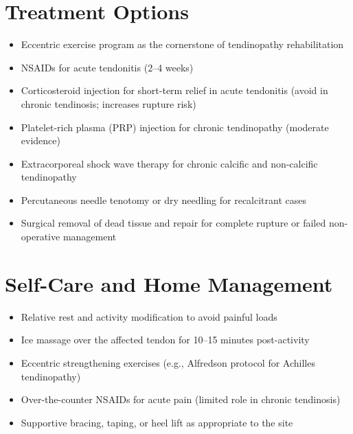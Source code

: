 \section*{Treatment Options}
\begin{itemize}
  \item Eccentric exercise program as the cornerstone of tendinopathy rehabilitation
  \item NSAIDs for acute tendonitis (2--4 weeks)
  \item Corticosteroid injection for short-term relief in acute tendonitis (avoid in chronic tendinosis; increases rupture risk)
  \item Platelet-rich plasma (PRP) injection for chronic tendinopathy (moderate evidence)
  \item Extracorporeal shock wave therapy for chronic calcific and non-calcific tendinopathy
  \item Percutaneous needle tenotomy or dry needling for recalcitrant cases
  \item Surgical removal of dead tissue and repair for complete rupture or failed non-operative management
\end{itemize}

\section*{Self-Care and Home Management}
\begin{itemize}
  \item Relative rest and activity modification to avoid painful loads
  \item Ice massage over the affected tendon for 10--15 minutes post-activity
  \item Eccentric strengthening exercises (e.g., Alfredson protocol for Achilles tendinopathy)
  \item Over-the-counter NSAIDs for acute pain (limited role in chronic tendinosis)
  \item Supportive bracing, taping, or heel lift as appropriate to the site
\end{itemize}

